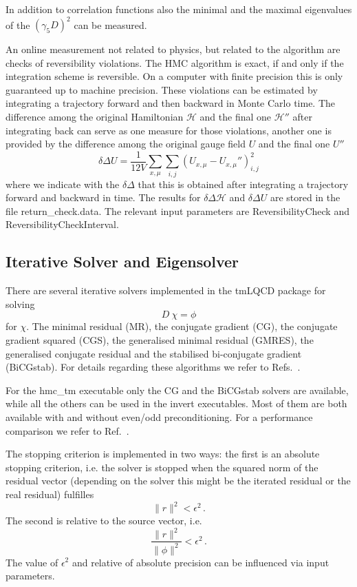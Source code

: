 In addition to correlation functions also the minimal and the maximal
eigenvalues of the $(\gamma_5 D)^2$ can be measured.

An online measurement not related to physics, but related to the
algorithm are checks of reversibility violations. The HMC algorithm is
exact, if 
and only if the integration scheme is reversible. On a computer with
finite precision this is only guaranteed up to machine precision.
These violations can be estimated by integrating a trajectory
forward and then backward in Monte Carlo time. The difference among
the original Hamiltonian $\mathcal{H}$ and the final one
$\mathcal{H}''$ after integrating back can serve as one measure for
those violations, another one is provided by the difference among the
original gauge field $U$ and the final one $U''$
\[
\delta\Delta U = \frac{1}{12V}
\sum_{x,\mu}\sum_{i,j} (U_{x,\mu}-U_{x,\mu}'')_{i,j}^2
\]
where we indicate with the $\delta\Delta$ that this is obtained after
integrating a trajectory forward and backward in time. The results for
$\delta\Delta \mathcal{H}$ and $\delta\Delta U$ are
stored in the file {\ttfamily return\_check.data}. The relevant input
parameters are {\ttfamily ReversibilityCheck} and {\ttfamily
  ReversibilityCheckInterval}.

\subsection{Iterative Solver and Eigensolver}

There are several iterative solvers implemented in the tmLQCD
package for solving 
\[
D\ \chi = \phi
\]
for $\chi$. The minimal residual (MR), the conjugate gradient (CG), the
conjugate gradient squared (CGS), the generalised minimal residual
(GMRES), the generalised conjugate residual and the stabilised
bi-conjugate gradient (BiCGstab). For details regarding these
algorithms we refer to Refs.~\cite{saad:2003a,meister:1999}.

For the {\ttfamily hmc\_tm} executable only the CG and the BiCGstab
solvers are available, while all the others can be used in the
{\ttfamily invert} executables. Most of them are both available with
and without even/odd preconditioning. For a performance comparison we
refer to Ref.~\cite{Chiarappa:2004ry,Chiarappa:2006hz}.

The stopping criterion is implemented in two ways: the first is an
absolute stopping criterion, i.e. the solver is stopped when the
squared norm of the residual vector (depending on the solver this
might be the iterated residual or the real residual) fulfilles
\[
\|r\|^2 < \epsilon^2\, .
\]
The second is relative to the source vector, i.e.
\[
\frac{\|r\|^2}{\|\phi\|^2} < \epsilon^2\, .
\]
The value of $\epsilon^2$ and relative of absolute precision can be
influenced via input parameters.


